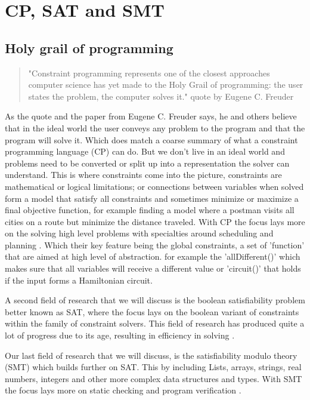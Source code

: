 \chapter{CP, SAT and SMT}
\label{cha:CS}

\section{Holy grail of programming} %
\label{CS:HolyGrail}
\begin{quote}
	"Constraint programming represents one of the closest approaches computer science has yet made to the Holy Grail of programming: the user states the problem, the computer solves it." \cite{11freuder1997pursuitHolyGrail} quote by Eugene C. Freuder
\end{quote}
As the quote and the paper from Eugene C. Freuder says, he and others believe that in the ideal world the user conveys any problem to the program and that the program will solve it. Which does match a coarse summary of what a constraint programming language (CP) can do. But we don't live in an ideal world and problems need to be converted or split up into a representation the solver can understand. This is where constraints come into the picture, constraints are mathematical or logical limitations; or connections between variables when solved form a model that satisfy all constraints and sometimes minimize or maximize a final objective function, for example finding a model where a postman visits all cities on a route but minimize the distance traveled. 
With CP the focus lays more on the solving high level problems with specialties around scheduling and planning \cite{52bartak1999constraint}. Which their key feature being the global constraints, a set of 'function' that are aimed at high level of abstraction. for example the 'allDifferent()' which makes sure that all variables will receive a different value or 'circuit()' that holds if the input forms a Hamiltonian circuit.

A second field of research that we will discuss is the boolean satisfiability problem better known as SAT, where the focus lays on the boolean variant of constraints within the family of constraint solvers. This field of research has produced quite a lot of progress due to its age, resulting in efficiency in solving \cite{56bardin2019bringing}.

Our last field of research that we will discuss, is the satisfiability modulo theory (SMT) which builds further on SAT. This by including Lists, arrays, strings, real numbers, integers and other more complex data structures and types. With SMT the focus lays more on static checking and program verification \cite{56bardin2019bringing, 54moura2008z3}.


